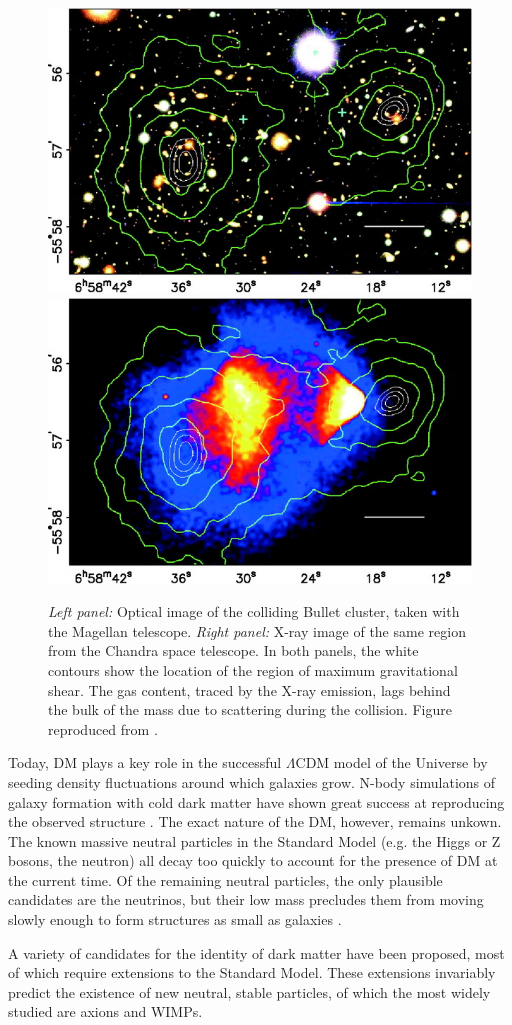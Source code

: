 \begin{figure}
\begin{center}
\includegraphics[width=0.45\columnwidth]{figures/clowe_a.jpg}
\includegraphics[width=0.45\columnwidth]{figures/clowe_b.jpg}
\end{center}
\caption{
\label{fig:clowe}
{\it Left panel:} Optical image of the colliding Bullet cluster, taken with the Magellan telescope.
{\it Right panel:} X-ray image of the same region from the Chandra space telescope.
In both panels, the white contours show the location of the region of maximum gravitational shear.
The gas content, traced by the X-ray emission, lags behind the bulk of the mass due to scattering during the collision.
Figure reproduced from \cite{clowe_direct_2006}.
}
\end{figure}


Today, DM plays a key role in the successful $\Lambda$CDM model of the Universe by seeding density fluctuations around which galaxies grow.
N-body simulations of galaxy formation with cold dark matter have shown great success at reproducing the observed structure \cite{bertone_particle_2010}.
The exact nature of the DM, however, remains unkown.
The known massive neutral particles in the Standard Model (e.g. the Higgs or Z bosons, the neutron) all decay too quickly to account for the presence of DM at the current time. Of the remaining neutral particles, the only plausible candidates are the neutrinos, but their low mass precludes them from moving slowly enough to form structures as small as galaxies \cite{einasto_dark_2009}. 

A variety of candidates for the identity of dark matter have been proposed, most of which require extensions to the Standard Model. 
These extensions invariably predict the existence of new neutral, stable particles, of which the most widely studied are axions and WIMPs.

